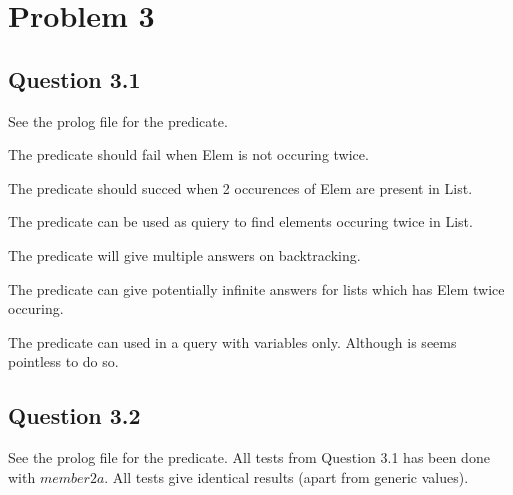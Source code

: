 \newpage
\section{Problem 3}

\subsection{Question 3.1}

See the prolog file for the predicate.

The predicate should fail when Elem is not occuring twice.

The predicate should succed when 2 occurences of Elem are present in List.

The predicate can be used as quiery to find elements occuring twice in List.

The predicate will give multiple answers on backtracking.

The predicate can give potentially infinite answers for lists which has Elem twice occuring.

The predicate can used in a query with variables only. Although is seems pointless to do so.


\subsection{Question 3.2}
See the prolog file for the predicate. All tests from Question 3.1 has been done with $member2a$. All tests give identical results (apart from generic values).